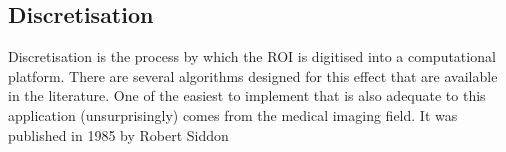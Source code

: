 \subsection{Discretisation}%
\label{sub:discretisation}

Discretisation is the process by which the \gls{ROI} is digitised into a
computational platform. There are several algorithms designed for this
effect that are available in the literature. One of the easiest to
implement that is also adequate to this application (unsurprisingly)
comes from the medical imaging field. It was published in 1985 by Robert
Siddon~\cite{siddon1985}
